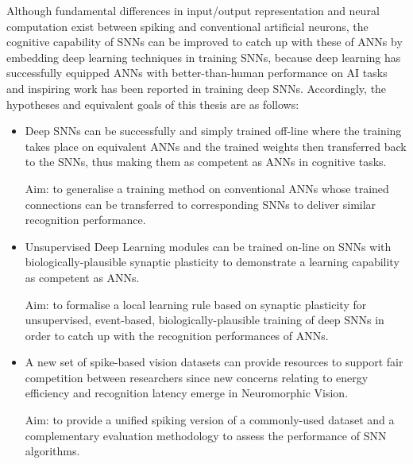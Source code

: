 Although fundamental differences in input/output representation and neural computation exist between spiking and conventional artificial neurons, the cognitive capability of SNNs can be improved to catch up with these of ANNs by embedding deep learning techniques in training SNNs, because deep learning has successfully equipped ANNs with better-than-human performance on AI tasks and inspiring work has been reported in training deep SNNs.
Accordingly, the hypotheses and equivalent goals of this thesis are as follows: 
\begin{itemize}
%

	\item 
	Deep SNNs can be successfully and simply trained off-line where the training takes place on equivalent ANNs and the trained weights then transferred back to the SNNs, thus making them as competent as ANNs in cognitive tasks. 
	
	Aim: to generalise a training method on conventional ANNs whose trained connections can be transferred to corresponding SNNs to deliver similar recognition performance.

	\item 
	Unsupervised Deep Learning modules can be trained on-line on SNNs with biologically-plausible synaptic plasticity to demonstrate a learning capability as competent as ANNs.

	Aim: to formalise a local learning rule based on synaptic plasticity for unsupervised, event-based, biologically-plausible training of deep SNNs in order to catch up with the recognition performances of ANNs.

	\item 
	A new set of spike-based vision datasets can provide resources to support fair competition between researchers since new concerns relating to energy efficiency and recognition latency emerge in Neuromorphic Vision.

	Aim: to provide a unified spiking version of a commonly-used dataset and a complementary evaluation methodology to assess the performance of SNN algorithms.
\end{itemize}


